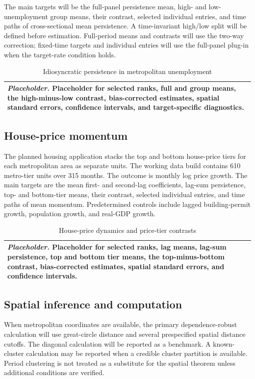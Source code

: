 \documentclass[11pt]{article}
\numberwithin{equation}{section}
\theoremstyle{remark}
\newcommand{\placeholdertable}[3]{%
\begin{table}[!htbp]
\centering
\caption{#1}
\label{#2}
\begin{tabular}{p{0.88\textwidth}}
\toprule
\textit{Placeholder.} #3\\
\bottomrule
\end{tabular}
\end{table}}
\begin{document}
The main targets will be the full-panel persistence mean, high- and low-unemployment group means, their contrast, selected individual entries, and time paths of cross-sectional mean persistence. A time-invariant high/low split will be defined before estimation. Full-period means and contrasts will use the two-way correction; fixed-time targets and individual entries will use the full-panel plug-in when the target-rate condition holds.

\placeholdertable{Idiosyncratic persistence in metropolitan unemployment}{tab:emp_unemployment}{Placeholder for selected ranks, full and group means, the high-minus-low contrast, bias-corrected estimates, spatial standard errors, confidence intervals, and target-specific diagnostics.}

\subsection{House-price momentum}

The planned housing application stacks the top and bottom house-price tiers for each metropolitan area as separate units. The working data build contains 610 metro-tier units over 315 months. The outcome is monthly log price growth. The main targets are the mean first- and second-lag coefficients, lag-sum persistence, top- and bottom-tier means, their contrast, selected individual entries, and time paths of mean momentum. Predetermined controls include lagged building-permit growth, population growth, and real-GDP growth.

\placeholdertable{House-price dynamics and price-tier contrasts}{tab:emp_housing}{Placeholder for selected ranks, lag means, lag-sum persistence, top and bottom tier means, the top-minus-bottom contrast, bias-corrected estimates, spatial standard errors, and confidence intervals.}

\subsection{Spatial inference and computation}

When metropolitan coordinates are available, the primary dependence-robust calculation will use great-circle distance and several prespecified spatial distance cutoffs. The diagonal calculation will be reported as a benchmark. A known-cluster calculation may be reported when a credible cluster partition is available. Period clustering is not treated as a substitute for the spatial theorem unless additional conditions are verified.
\end{document}
